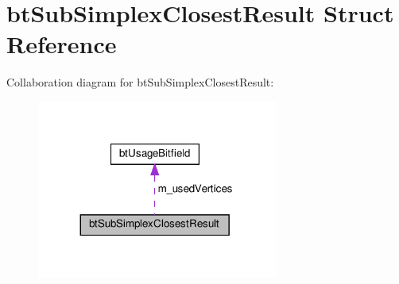 \hypertarget{structbtSubSimplexClosestResult}{}\section{bt\+Sub\+Simplex\+Closest\+Result Struct Reference}
\label{structbtSubSimplexClosestResult}


Collaboration diagram for bt\+Sub\+Simplex\+Closest\+Result\+:
\nopagebreak
\begin{figure}[H]
\begin{center}
\leavevmode
\includegraphics[width=224pt]{structbtSubSimplexClosestResult__coll__graph}
\end{center}
\end{figure}
